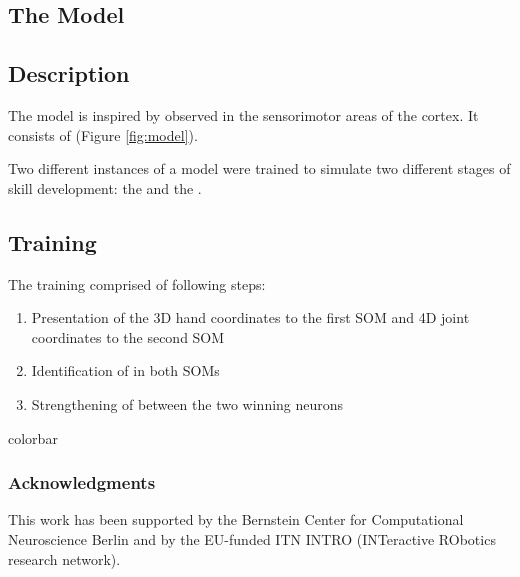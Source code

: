 \documentclass[final]{beamer}
\begin{document}
\begin{frame}[t]
\begin{multicols}{2}
\section{The Model}

\subsection{Description}
The model is inspired by  observed in the sensorimotor areas of the cortex. It consists of  (Figure \ref{fig:model}).

Two different instances of a model were trained to simulate two different stages of skill development:  the  and the . %


\subsection{Training}
The training comprised of following steps:

\begin{enumerate}
 \item Presentation of the 3D hand coordinates to the first SOM and 4D joint coordinates to the second SOM
 \item Identification of  in both SOMs 
 \item Strengthening of  between the two winning neurons
\end{enumerate}

\begin{beamercolorbox}[wd=1\linewidth,colsep=0.03cm]{colorbar}
\end{beamercolorbox}

\subsubsection{Acknowledgments}
{\small  
This work has been supported by the Bernstein Center for Computational Neuroscience Berlin and by the EU-funded ITN INTRO (INTeractive RObotics research network).}


\end{multicols}
\end{frame}
\end{document}

